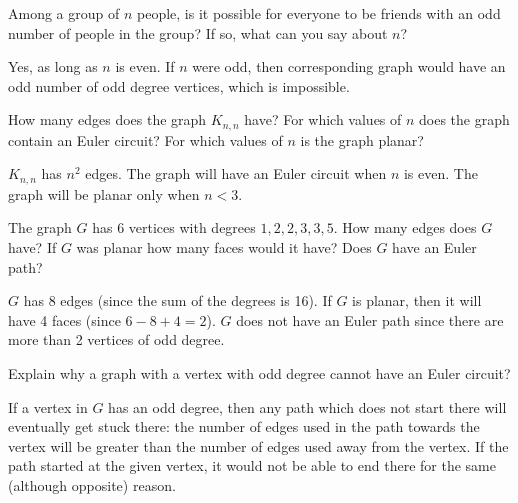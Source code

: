 \begin{squestions}
\begin{answer}
  \end{answer}


\question Among a group of $n$ people, is it possible for everyone to be friends with an odd number of people in the group?  If so, what can you say about $n$?

  \begin{answer}
  Yes, as long as $n$ is even.  If $n$ were odd, then corresponding graph would have an odd number of odd degree vertices, which is impossible.
  \end{answer}


\question How many edges does the graph $K_{n,n}$ have?  For which values of $n$ does the graph contain an Euler circuit?  For which values of $n$ is the graph planar?

  \begin{answer}
  $K_{n,n}$ has $n^2$ edges.  The graph will have an Euler circuit when $n$ is even.  The graph will be planar only when $n < 3$.
  \end{answer}


\question The graph $G$ has 6 vertices with degrees $1, 2, 2, 3, 3, 5$.  How many edges does $G$ have?  If $G$ was planar how many faces would it have?  Does $G$ have an Euler path?

  \begin{answer}
  $G$ has 8 edges (since the sum of the degrees is 16).  If $G$ is planar, then it will have 4 faces (since $6 - 8 + 4 = 2$).  $G$ does not have an Euler path since there are more than 2 vertices of odd degree.
  \end{answer}


\question Explain why a graph with a vertex with odd degree cannot have an Euler circuit? 

  \begin{answer}
  If a vertex in $G$ has an odd degree, then any path which does not start there will eventually get stuck there: the number of edges used in the path towards the vertex will be greater than the number of edges used away from the vertex.  If the path started at the given vertex, it would not be able to end there for the same (although opposite) reason.
  \end{answer}



\end{squestions}
